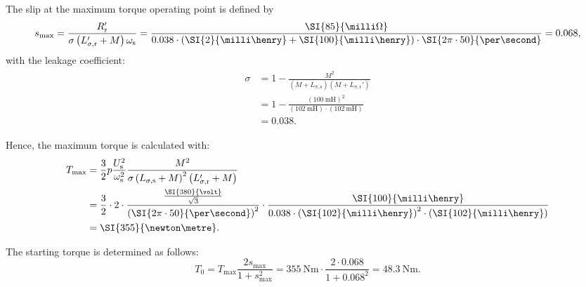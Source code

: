 
\begin{solutionblock}
    The slip at the maximum torque operating point is defined by
    \begin{equation}
        s_{\mathrm{max}} = \frac{R_{\mathrm{r}}'}{\sigma \left(L_{\mathrm{\sigma,r}}' + M\right) \omega_{\mathrm{s}}}
        = \frac{\SI{85}{\milli\Omega}}{0.038 \cdot (\SI{2}{\milli\henry}+\SI{100}{\milli\henry}) \cdot \SI{2\pi\cdot 50}{\per\second}}
        = 0.068,
    \end{equation}
    with the leakage coefficient:
    \begin{align}
        \begin{split}
            \sigma &= 1- \frac{M^2}{(M+L_{\mathrm{\sigma,s}})(M+L_{\mathrm{\sigma,r}}')}\\
            &= 1 - \frac{\left(\SI{100}{\milli\henry}\right)^2}{\left(\SI{102}{\milli\henry}\right)\cdot\left(\SI{102}{\milli\henry}\right)}\\
            &= 0.038.
        \end{split}
    \end{align}

    Hence, the maximum torque is calculated with:
    \begin{align}
        \begin{split}
            T_{\mathrm{max}} &= \frac{3}{2}p \frac{U_{\mathrm{s}}^2}{\omega_{\mathrm{s}}^2}\frac{M^2}{\sigma \left(L_{\mathrm{\sigma,s}}+M \right)^2\left(L_{\mathrm{\sigma,r}}'+M\right)} \\
            &= \frac{3}{2}\cdot2\cdot\frac{\frac{\SI{380}{\volt}}{\sqrt{3}}}{\left(\SI{2\pi\cdot 50}{\per\second}\right)^2} \cdot \frac{\SI{100}{\milli\henry}}{0.038\cdot\left(\SI{102}{\milli\henry}\right)^2 \cdot \left(\SI{102}{\milli\henry}\right)}\\
            &= \SI{355}{\newton\metre}.
        \end{split}
    \end{align}

    The starting torque is determined as follows:
    \begin{equation}
        T_{\mathrm{0}} = T_{\mathrm{max}} \frac{2 s_{\mathrm{max}}}{1 + s_{\mathrm{max}}^2}
        = \SI{355}{\newton\metre}\cdot \frac{2 \cdot 0.068}{1 + 0.068^2} = \SI{48.3}{\newton\metre}.
    \end{equation}
\end{solutionblock}


